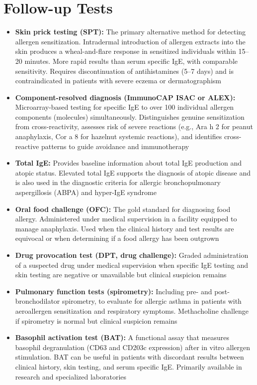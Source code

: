 \section*{Follow-up Tests}
\begin{itemize}
  \item \textbf{Skin prick testing (SPT):} The primary alternative method for detecting allergen sensitization. Intradermal introduction of allergen extracts into the skin produces a wheal-and-flare response in sensitized individuals within 15--20 minutes. More rapid results than serum specific IgE, with comparable sensitivity. Requires discontinuation of antihistamines (5--7 days) and is contraindicated in patients with severe eczema or dermatographism
  \item \textbf{Component-resolved diagnosis (ImmunoCAP ISAC or ALEX):} Microarray-based testing for specific IgE to over 100 individual allergen components (molecules) simultaneously. Distinguishes genuine sensitization from cross-reactivity, assesses risk of severe reactions (e.g., Ara h 2 for peanut anaphylaxis, Cor a 8 for hazelnut systemic reactions), and identifies cross-reactive patterns to guide avoidance and immunotherapy
  \item \textbf{Total IgE:} Provides baseline information about total IgE production and atopic status. Elevated total IgE supports the diagnosis of atopic disease and is also used in the diagnostic criteria for allergic bronchopulmonary aspergillosis (ABPA) and hyper-IgE syndrome
  \item \textbf{Oral food challenge (OFC):} The gold standard for diagnosing food allergy. Administered under medical supervision in a facility equipped to manage anaphylaxis. Used when the clinical history and test results are equivocal or when determining if a food allergy has been outgrown
  \item \textbf{Drug provocation test (DPT, drug challenge):} Graded administration of a suspected drug under medical supervision when specific IgE testing and skin testing are negative or unavailable but clinical suspicion remains
  \item \textbf{Pulmonary function tests (spirometry):} Including pre- and post-bronchodilator spirometry, to evaluate for allergic asthma in patients with aeroallergen sensitization and respiratory symptoms. Methacholine challenge if spirometry is normal but clinical suspicion remains
  \item \textbf{Basophil activation test (BAT):} A functional assay that measures basophil degranulation (CD63 and CD203c expression) after in vitro allergen stimulation. BAT can be useful in patients with discordant results between clinical history, skin testing, and serum specific IgE. Primarily available in research and specialized laboratories

\end{itemize}

